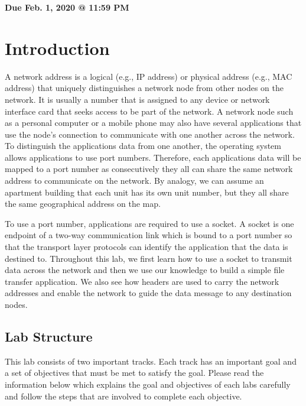 \documentclass[11pt]{article}
\makeatletter
\def\datedue{Feb. 1, 2020 @ 11:59 PM}
\makeatother
\begin{document}
\maketitle \thispagestyle{fancy}

\hfill {\large \textbf{Due \datedue}}


\section{Introduction}
\label{sec:introduction}
A network address is a logical (e.g., IP address) or physical address (e.g., MAC address) that uniquely distinguishes a network node from other nodes on the network. It is usually a number that is assigned to any device or network interface card that seeks access to be part of the network. A network node such as a personal computer or a mobile phone may also have several applications that use the node's connection to communicate with one another across the network. To distinguish the applications data from one another, the operating system allows applications to use port numbers. Therefore, each applications data will be mapped to a port number as consecutively they all can share the same network address to communicate on the network. By analogy, we can assume an apartment building that each unit has its own unit number, but they all share the same geographical address on the map.

To use a port number, applications are required to use a socket. A socket is one endpoint of a two-way communication link which is bound to a port number so that the transport layer protocols can identify the application that the data is destined to. Throughout this lab, we first learn how to use a socket to transmit data across the network and then we use our knowledge to build a simple file transfer application. We also see how headers are used to carry the network addresses and enable the network to guide the data message to any destination nodes.

\subsection{Lab Structure}
\label{subsec:lab-structure}
This lab consists of two important tracks. Each track has an important goal and a set of objectives that must be met to satisfy the goal. Please read the information below which explains the goal and objectives of each labs carefully and follow the steps that are involved to complete each objective.
\end{document}
